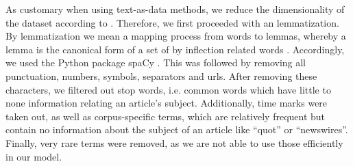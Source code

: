 As customary when using text-as-data methods, we reduce the dimensionality of the dataset according to \cite{grimmer.2022} . Therefore, we first proceeded with an lemmatization. By lemmatization we mean a mapping process from words to lemmas, whereby a lemma is the canonical form of a set of by inflection related words \citep{grimmer.2022}. Accordingly, we used the Python package spaCy \citep{spacy.2017}. This was followed by removing all punctuation, numbers, symbols, separators and urls. After removing these characters, we filtered out stop words, i.e. common words which have little to none information relating an article's subject. Additionally, time marks were taken out, as well as corpus-specific terms, which are relatively frequent but contain no information about the subject of an article like ``quot'' or ``newswires''. Finally, very rare terms were removed, as we are not able to use those efficiently in our model. 



